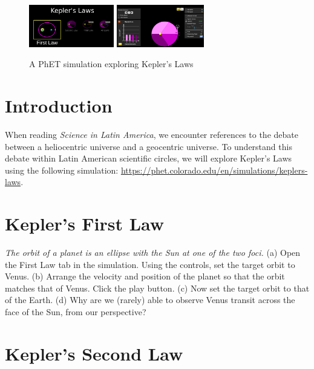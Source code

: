 \documentclass[12pt]{article}
\begin{document}
\maketitle

\small

\begin{figure}[ht]
\centering
\includegraphics[width=0.33\textwidth]{figures/kepler3.png}
\includegraphics[width=0.34\textwidth]{figures/kepler2.png}
\caption{\label{fig:1b} A PhET simulation exploring Kepler's Laws}
\end{figure}

\section{Introduction}

When reading \textit{Science in Latin America}, we encounter references to the debate between a heliocentric universe and a geocentric universe.  To understand this debate within Latin American scientific circles, we will explore Kepler's Laws using the following simulation: \url{https://phet.colorado.edu/en/simulations/keplers-laws}.

\section{Kepler's First Law}

\textit{The orbit of a planet is an ellipse with the Sun at one of the two foci.}  (a) Open the First Law tab in the simulation.  Using the controls, set the target orbit to Venus.  (b) Arrange the velocity and position of the planet so that the orbit matches that of Venus. Click the play button.  (c) Now set the target orbit to that of the Earth.  (d) Why are we (rarely) able to observe Venus transit across the face of the Sun, from our perspective? \\ \vspace{0.25cm}

\section{Kepler's Second Law}
\end{document}
